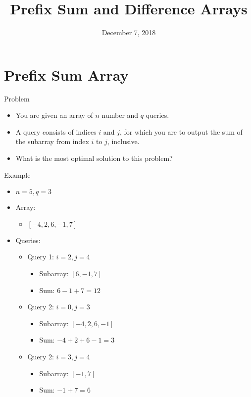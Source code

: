 \documentclass{beamer}
\title[Prefix Sum and Difference Arrays---Computer Science Club]{\textbf{Prefix Sum and Difference Arrays}}
\institute{Stephen Lewis Secondary School \\[3ex] {\large Computer Science Club}}
\date{December 7, 2018}
\begin{document}
\begin{frame} 
\titlepage 
\end{frame} 

\section{Prefix Sum Array}

\begin{frame}{Problem}
\begin{itemize}
    \item You are given an array of $n$ number and $q$ queries.
    \item A query consists of indices $i$ and $j$, for which you are to output the sum of the subarray from index $i$ to $j$, inclusive.
    \item What is the most optimal solution to this problem?
\end{itemize}
\end{frame}

\begin{frame}{Example}
    \begin{itemize}
        \item $n = 5, q = 3$
        \item Array:
        \begin{itemize}
            \item $[-4, 2, 6, -1, 7]$
        \end{itemize}
        
        \item Queries:
        \begin{itemize}
            \item Query 1: $i = 2, j = 4$
            \begin{itemize}
                \item Subarray: $[6, -1, 7]$
                \item Sum: $6 - 1 + 7 = 12$
            \end{itemize}
            
            \item Query 2: $i = 0, j = 3$
            \begin{itemize}
                \item Subarray: $[-4, 2, 6, -1]$
                \item Sum: $-4 + 2 + 6 - 1 = 3$
            \end{itemize}
            
            \item Query 2: $i = 3, j = 4$
            \begin{itemize}
                \item Subarray: $[-1, 7]$
                \item Sum: $-1 + 7 = 6$
            \end{itemize}
        \end{itemize}
    \end{itemize}
\end{frame}
\end{document}
